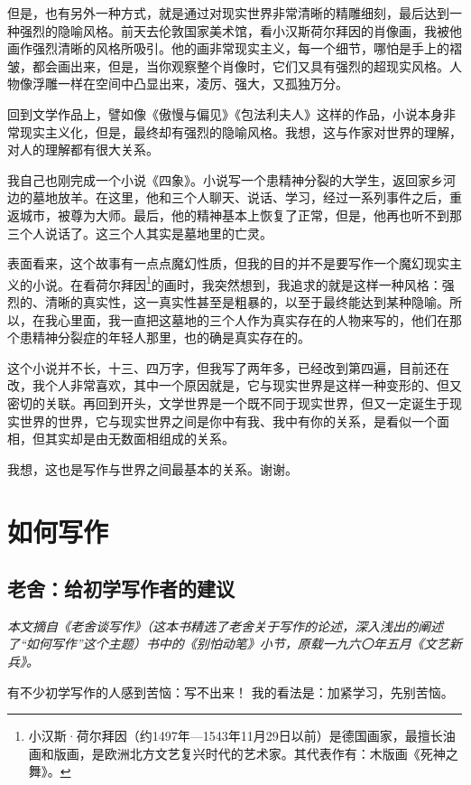 \documentclass[fontset=fandol,12pt,a5paper]{ctexbook}
\begin{document}
但是，也有另外一种方式，就是通过对现实世界非常清晰的精雕细刻，最后达到一种强烈的隐喻风格。前天去伦敦国家美术馆，看小汉斯荷尔拜因的肖像画，我被他画作强烈清晰的风格所吸引。他的画非常现实主义，每一个细节，哪怕是手上的褶皱，都会画出来，但是，当你观察整个肖像时，它们又具有强烈的超现实风格。人物像浮雕一样在空间中凸显出来，凌厉、强大，又孤独万分。

回到文学作品上，譬如像《傲慢与偏见》《包法利夫人》这样的作品，小说本身非常现实主义化，但是，最终却有强烈的隐喻风格。我想，这与作家对世界的理解，对人的理解都有很大关系。

我自己也刚完成一个小说《四象》。小说写一个患精神分裂的大学生，返回家乡河边的墓地放羊。在这里，他和三个人聊天、说话、学习，经过一系列事件之后，重返城市，被尊为大师。最后，他的精神基本上恢复了正常，但是，他再也听不到那三个人说话了。这三个人其实是墓地里的亡灵。

表面看来，这个故事有一点点魔幻性质，但我的目的并不是要写作一个魔幻现实主义的小说。在看荷尔拜因\footnote{小汉斯·荷尔拜因（约1497年—1543年11月29日以前）是德国画家，最擅长油画和版画，是欧洲北方文艺复兴时代的艺术家。其代表作有：木版画《死神之舞》。}的画时，我突然想到，我追求的就是这样一种风格：强烈的、清晰的真实性，这一真实性甚至是粗暴的，以至于最终能达到某种隐喻。所以，在我心里面，我一直把这墓地的三个人作为真实存在的人物来写的，他们在那个患精神分裂症的年轻人那里，也的确是真实存在的。

这个小说并不长，十三、四万字，但我写了两年多，已经改到第四遍，目前还在改，我个人非常喜欢，其中一个原因就是，它与现实世界是这样一种变形的、但又密切的关联。再回到开头，文学世界是一个既不同于现实世界，但又一定诞生于现实世界的世界，它与现实世界之间是你中有我、我中有你的关系，是看似一个面相，但其实却是由无数面相组成的关系。

我想，这也是写作与世界之间最基本的关系。谢谢。
\newpage

\chapter{如何写作}

\section{老舍：给初学写作者的建议}

\emph{本文摘自《老舍谈写作》（这本书精选了老舍关于写作的论述，深入浅出的阐述了“如何写作”这个主题）书中的《别怕动笔》小节，原载一九六〇年五月《文艺新兵》。}
\vspace{2em}

有不少初学写作的人感到苦恼：写不出来！
我的看法是：加紧学习，先别苦恼。
\end{document}
